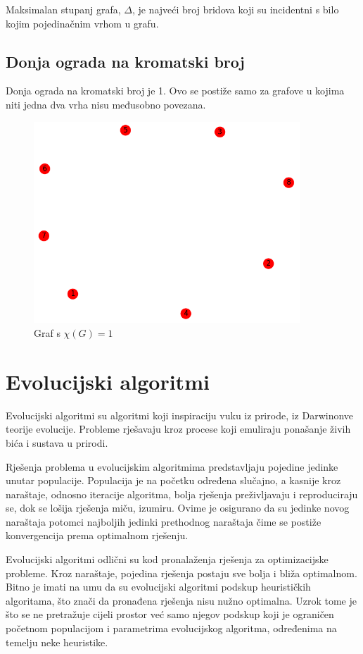 \documentclass[times, utf8, zavrsni]{fer}
\begin{document}
Maksimalan stupanj grafa, $\Delta$, je najveći broj bridova koji su incidentni s bilo kojim pojedinačnim vrhom u grafu.

\section{Donja ograda na kromatski broj}
Donja ograda na kromatski broj je 1. Ovo se postiže samo za grafove u kojima niti jedna dva vrha nisu međusobno povezana.

\begin{figure}[htb]
\centering
\includegraphics[width=10cm]{images/8_vertices_nepovezane.png}
\caption{Graf s $\chi(G)=1$}
\label{fig:graf s kromatskim brojem 1}
\end{figure}

\chapter{Evolucijski algoritmi}

Evolucijski algoritmi su algoritmi koji inspiraciju vuku iz prirode, iz Darwinonve teorije evolucije. Probleme rješavaju kroz procese koji emuliraju ponašanje živih bića i sustava u prirodi.

Rješenja problema u evolucijskim algoritmima predstavljaju pojedine jedinke unutar populacije. Populacija je na početku određena slučajno, a kasnije kroz naraštaje, odnosno iteracije algoritma, bolja rješenja preživljavaju i reproduciraju se, dok se lošija rješenja miču, izumiru. Ovime je osigurano da su jedinke novog naraštaja potomci najboljih jedinki prethodnog naraštaja čime se postiže konvergencija prema optimalnom rješenju.

Evolucijski algoritmi odlični su kod pronalaženja rješenja za optimizacijske probleme. Kroz naraštaje, pojedina rješenja postaju sve bolja i bliža optimalnom. Bitno je imati na umu da su evolucijski algoritmi podskup heurističkih algoritama, što znači da pronađena rješenja nisu nužno optimalna. Uzrok tome je što se ne pretražuje cijeli prostor već samo njegov podskup koji je ograničen početnom populacijom i parametrima evolucijskog algoritma, određenima na temelju neke heuristike.
\end{document}
